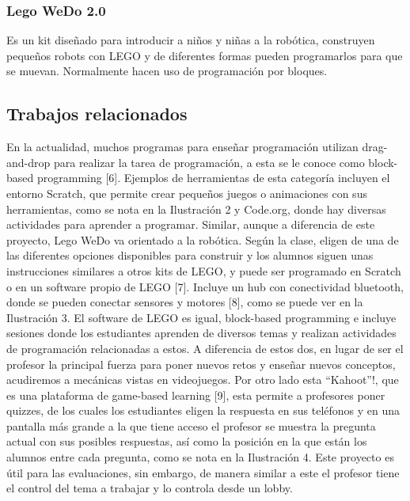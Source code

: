 \subsubsection{Lego WeDo 2.0}
Es un kit diseñado para introducir a niños y niñas a la robótica, 
construyen pequeños robots con LEGO y de diferentes 
formas pueden programarlos para que se muevan. 
Normalmente hacen uso de programación por bloques.

\subsection{Trabajos relacionados}
En la actualidad, muchos programas para enseñar programación utilizan 
drag-and-drop para realizar la tarea de programación, 
a esta se le conoce como block-based programming [6]. 
Ejemplos de herramientas de esta categoría incluyen el entorno Scratch, 
que permite crear pequeños juegos o animaciones con sus herramientas, 
como se nota en la Ilustración 2 y Code.org, donde hay diversas actividades 
para aprender a programar. 
Similar, aunque a diferencia de este proyecto, Lego WeDo va orientado a la robótica. Según la clase, eligen de una de las diferentes opciones disponibles para construir y los alumnos siguen unas instrucciones similares a otros kits de LEGO, y puede ser programado en Scratch o en un software propio de LEGO [7]. Incluye un hub con conectividad bluetooth, donde se pueden conectar sensores y motores [8], como se puede ver en la Ilustración 3. El software de LEGO es igual, block-based programming e incluye sesiones donde los estudiantes aprenden de diversos temas y realizan actividades de programación relacionadas a estos. A diferencia de estos dos, en lugar de ser el profesor la principal fuerza para poner nuevos retos y enseñar nuevos conceptos, acudiremos a mecánicas vistas en videojuegos.
Por otro lado esta “Kahoot”!, que es una plataforma de game-based learning [9], esta permite a profesores poner quizzes, de los cuales los estudiantes eligen la respuesta en sus teléfonos y en una pantalla más grande a la que tiene acceso el profesor se muestra la pregunta actual con sus posibles respuestas, así como la posición en la que están los alumnos entre cada pregunta, como se nota en la Ilustración 4. Este proyecto es útil para las evaluaciones, sin embargo, de manera similar a este el profesor tiene el control del tema a trabajar y lo controla desde un lobby. 
